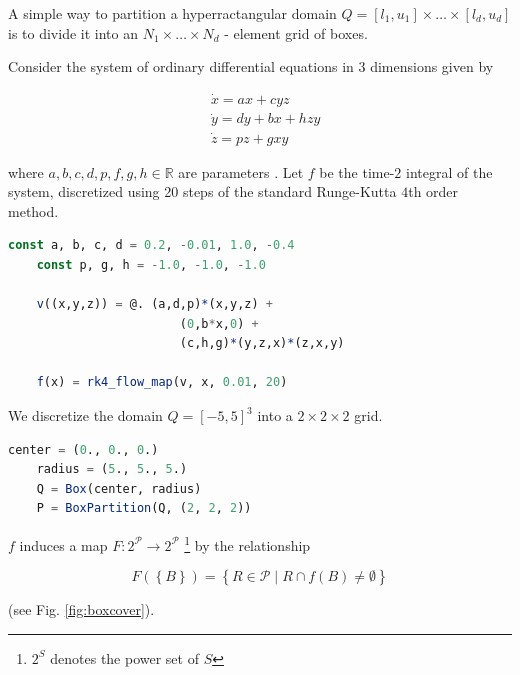 \documentclass{juliacon}
\newcommand{\R}{{\mathbb R}}
\newcommand{\cP}{\mathcal{P}}
\begin{document}
A simple way to partition a hyperractangular domain $Q = \left[ l_1, u_1 \right] \times \ldots \times \left[ l_d, u_d \right]$ is to divide it into an $N_1 \times \ldots \times N_d$ - element grid of boxes. 

Consider the system of ordinary differential equations in $3$ dimensions given by 

\begin{equation}
    \label{eq:ode}
    \begin{split}
        &\dot{x} = ax + cyz \\
        &\dot{y} = dy + bx + hzy \\ 
        &\dot{z} = pz + gxy 
    \end{split}
\end{equation}

where $a,b,c,d,p,f,g,h \in \R$ are parameters \cite{3dattractor}. Let $f$ be the time-$2$ integral of the system, discretized using 20 steps of the standard Runge-Kutta $4$th order method. 

\begin{lstlisting}[language=Julia,label=lst:map]
    const a, b, c, d = 0.2, -0.01, 1.0, -0.4
    const p, g, h = -1.0, -1.0, -1.0

    v((x,y,z)) = @. (a,d,p)*(x,y,z) + 
                        (0,b*x,0) + 
                        (c,h,g)*(y,z,x)*(z,x,y)

    f(x) = rk4_flow_map(v, x, 0.01, 20)
\end{lstlisting}

We discretize the domain $Q = \left[ -5, 5 \right]^3$ into a $2 \times 2 \times 2$ grid. 

\begin{lstlisting}[language=Julia,label=lst:box]
    center = (0., 0., 0.)
    radius = (5., 5., 5.)
    Q = Box(center, radius)
    P = BoxPartition(Q, (2, 2, 2))
\end{lstlisting}

$f$ induces a map $F : 2^\cP \to 2^\cP$ \footnote{$2^S$ denotes the power set of $S$} by the relationship 

\begin{equation}
    F \left( \left\{ B \right\} \right) = 
    \left\{ R \in \cP \mid R \cap f(B) \neq \emptyset \right\}
\end{equation}

(see Fig. \ref{fig:boxcover}). 
\end{document}
